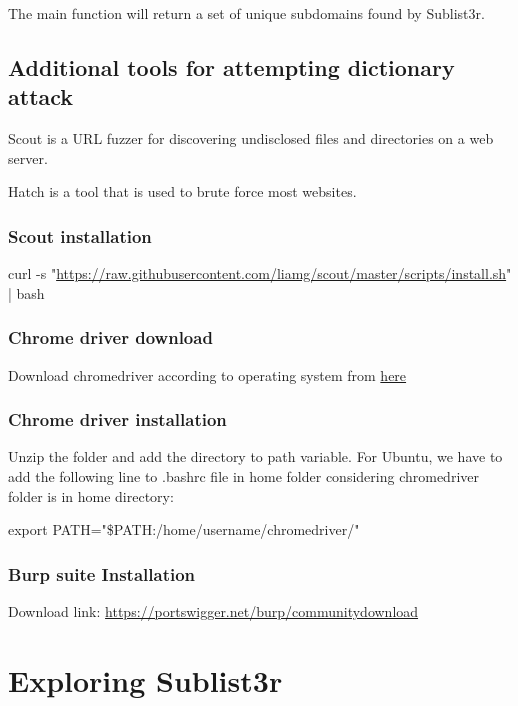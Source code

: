 \documentclass[12pt]{article}
\begin{document}
    The main function will return a set of unique subdomains found by Sublist3r.

\subsection{Additional tools for attempting dictionary attack}\label{subsec:additional-tools-for-attempting-dictionary-attack}
Scout is a URL fuzzer for discovering undisclosed files and directories on a web server.

Hatch is a tool that is used to brute force most websites.

\subsubsection{Scout installation}\label{subsubsec:scout-installation}
curl -s "\href{https://raw.githubusercontent.com/liamg/scout/master/scripts/install.sh}{https://raw.githubusercontent.com/liamg/scout/master/scripts/install.sh}" | bash

\subsubsection{Chrome driver download}\label{subsubsec:chrome-driver-download}
Download chromedriver according to operating system from \href{https://googlechromelabs.github.io/chrome-for-testing/}{here}

\subsubsection{Chrome driver installation}\label{subsubsec:chrome-driver-installation}
Unzip the folder and add the directory to path variable. For Ubuntu, we have to add the following line to .bashrc file in home folder considering chromedriver folder is in home directory:

export PATH="\$PATH:/home/username/chromedriver/"

\subsubsection{Burp suite Installation}\label{subsubsec:burp-suite-installation}
Download link: \href{https://portswigger.net/burp/communitydownload} {https://portswigger.net/burp/communitydownload}

\section{Exploring Sublist3r}\label{sec:exploring-sublist3r}
\end{document}
